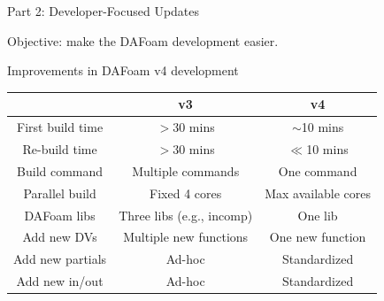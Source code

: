 \documentclass{bredelebeamer}
\begin{document}
\begin{frame}{}

  \begin{center}
     \noindent \Large{Part 2: Developer-Focused Updates}
  \end{center}

  \begin{center}
    \noindent \large{Objective: make the DAFoam development easier.}
 \end{center}
  
\end{frame}

\begin{frame}{Improvements in DAFoam v4 development}

\begin{table}
\centering
\begin{tabular}{ccc}
\hline
& v3 & v4 \\
\hline
First build time & $>$30 mins & $\sim$10 mins \\
Re-build time & $>$30 mins & $\ll$10 mins \\
Build command & Multiple commands & One command \\
Parallel build & Fixed 4 cores & Max available cores \\ 
DAFoam libs &  Three libs (e.g., incomp) & One lib \\
Add new DVs & Multiple new functions & One new function \\
Add new partials & Ad-hoc & Standardized \\
Add new in/out & Ad-hoc & Standardized \\

\hline
\end{tabular}
\end{table}

\end{frame}
\end{document}
